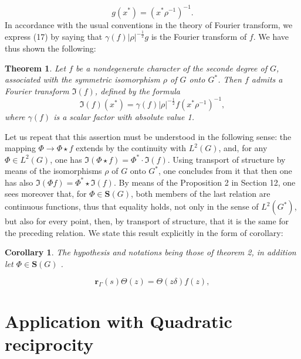\documentclass[12pt]{amsart}
\newtheorem{thm}{Theorem}
\newtheorem{cor}{Corollary}
\def\br{{\mathbf{r}}}
\newcounter{ssection}
\renewcommand{\subsection}{
  \addtocounter{ssection}{1}{\bf  \arabic{ssection}.\  }}
\begin{document}
\[
g(x^{*})=(x^{*}\rho^{-1})^{-1}.\]
 In accordance with the usual conventions in the theory of Fourier
transform, we express (17) by saying that $\gamma(f)|\rho|^{-\frac{1}{2}}g$
is the Fourier transform of $f$. We have thus shown the following: 
\begin{thm}
Let $f$ be a nondegenerate character of the seconde degree of $G$,
associated with the symmetric isomorphism $\rho$ of $G$ onto $G^{*}$.
Then $f$ admits a Fourier transform $\mathfrak{I}(f)$, defined by
the formula \[
\mathfrak{I}(f)(x^{*})=\gamma(f)|\rho|^{-\frac{1}{2}}f(x^{*}\rho^{-1})^{-1},\]
 where $\gamma(f)$ is a scalar factor with absolute value 1.
\end{thm}
Let us repeat that this assertion must be understood in the following
sense: the mapping $\Phi\to\Phi\star f$ extends by the continuity
with $L^{2}(G)$, and, for any $\Phi\in L^{2}(G)$, one has $\mathfrak{I}(\Phi\star f)=\Phi^{*}\cdot\mathfrak{I}(f)$.
Using transport of structure by means of the isomorphisms $\rho$
of $G$ onto $G^{*}$, one concludes from it that then one has also
$\mathfrak{I}(\Phi f)=\Phi^{*}\star\mathfrak{I}(f)$. By means of
the Proposition 2 in Section 12, one sees moreover that, for $\Phi\in\mathbf{S}(G)$,
both members of the last relation are continuous functions, thus that
equality holds, not only in the sense of $L^{2}(G^{*})$, but also
for every point, then, by transport of structure, that it is the same
for the preceding relation. We state this result explicitly in the
form of corollary: 
\begin{cor}
The hypothesis and notations being those of theorem 2, in addition
let $\Phi\in\mathbf{S}(G)$ .
\end{cor}

\setcounter{ssection}{18}
\subsection{}
\begin{equation}\label{eq:25}
\br_\Gamma(s)\Theta(z) = \Theta(z\delta)f(z),
\end{equation}


\setcounter{ssection}{22}

\section{Application  with Quadratic reciprocity}
\end{document}
